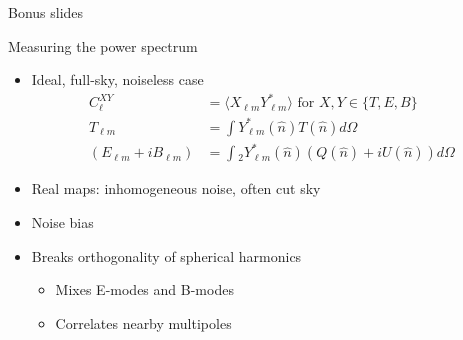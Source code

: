\documentclass{beamer}
\begin{document}

\begin{frame}{Bonus slides}
\end{frame}

\begin{frame}{Measuring the power spectrum}
	\begin{itemize}
		\item Ideal, full-sky, noiseless case
			\begin{align*}
				C_\ell^{XY} &= \langle X_{\ell m} Y_{\ell m}^* \rangle \textrm{  for  } X,Y \in \{T,E,B\} \\
				T_{\ell m} &= \int Y_{\ell m}^*(\hat n) T(\hat n) d\Omega \\
				(E_{\ell m} + iB_{\ell m}) &= \int {}_2Y_{\ell m}^*(\hat n)(Q(\hat n)+iU(\hat n)) d\Omega
			\end{align*}
		\item Real maps: inhomogeneous noise, often cut sky
		\item Noise bias
		\item Breaks orthogonality of spherical harmonics
			\begin{itemize}
				\item Mixes E-modes and B-modes
				\item Correlates nearby multipoles
			\end{itemize}
	\end{itemize}
\end{frame}
\end{document}
